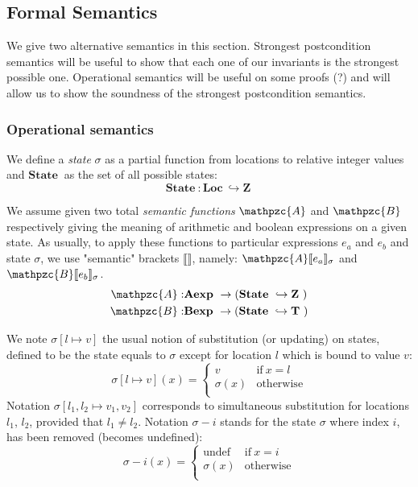 \documentclass[a4paper,10pt]{article}
\newcommand{\idx}{\ensuremath{i}\xspace}
\newcommand{\SLoc}{\ensuremath{\mathrm{\textbf{Loc}}~}}
\newcommand{\Sstate}{\ensuremath{\mathrm{\textbf{State}}~}}
\newcommand{\SZ}{\ensuremath{\mathrm{\textbf{Z}}~}}
\newcommand{\ST}{\ensuremath{\mathrm{\textbf{T}}~}}
\newcommand{\SAexp}{\ensuremath{\mathrm{\textbf{Aexp}}~}}
\newcommand{\SBexp}{\ensuremath{\mathrm{\textbf{Bexp}}~}}
\newcommand{\SemF}[3]{\ensuremath{#1 \llbracket #2 \rrbracket_{#3} \xspace}}
\newcommand{\SemFA}[2]{\SemF{\mathpzc{A}}{#1}{#2}}
\newcommand{\SemFB}[2]{\SemF{\mathpzc{B}}{#1}{#2}}
\begin{document}
\subsection*{Formal Semantics}

We give two alternative semantics in this section. Strongest postcondition semantics 
will be useful to show that each one of our invariants is the strongest possible one. 
Operational semantics will be useful on some proofs (?) and will allow us to show 
the soundness of the strongest postcondition semantics.

\subsubsection*{Operational semantics}
\newcommand{\env}{\ensuremath{\sigma}\xspace}
\newcommand{\eval}[2]{<#1, #2>}

We define a \textit{state} $\sigma$ as a partial function from locations to relative 
integer values and $\Sstate$ as the set of all possible states:
$$\Sstate : \SLoc \hookrightarrow \SZ$$

We assume given two total \textit{semantic functions} $\mathpzc{A}$ and $\mathpzc{B}$ 
respectively giving the meaning of arithmetic and boolean expressions on a given state. 
As usually, to apply these functions to particular expressions $e_a$ and $e_b$ and
state $\sigma$, we  use "semantic" brackets $\llbracket \rrbracket$, namely:
$\SemFA{e_a}{\sigma}$ and $\SemFB{e_b}{\sigma}$. 
\begin{eqnarray*}
\mathpzc{A}: & \SAexp \rightarrow (\Sstate \hookrightarrow \SZ)\\
\mathpzc{B}: & \SBexp \rightarrow (\Sstate \hookrightarrow \ST)\\
\end{eqnarray*}

We note $\sigma[l \mapsto v]$ the usual notion of substitution (or updating) on states, 
defined to be the state equals to $\sigma$ except for location $l$ which is bound to value $v$:
$$
\sigma[l \mapsto v] (x)= \left \{
\begin{array}{ll}
v & \mathrm{if ~} x=l\\
\sigma(x) & \mathrm{otherwise}\\
\end{array}
\right.
$$
Notation $\sigma[l_1, l_2 \mapsto v_1, v_2]$ corresponds to simultaneous substitution 
for locations $l_1$, $l_2$, provided that $l_1 \neq l_2$. Notation $\sigma - i$ stands 
for the state $\sigma$ where index \idx, has been removed (becomes undefined):
$$
\sigma - i (x)= \left \{
\begin{array}{ll}
\mathrm{undef}  & \mathrm{if~} x=i\\
\sigma(x) & \mathrm{otherwise}\\
\end{array}
\right.
$$
\end{document}
